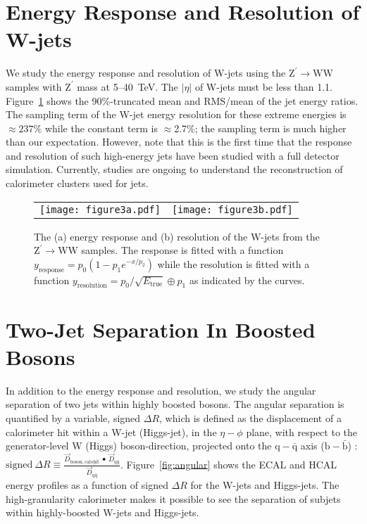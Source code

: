 \documentclass{PoS}
\begin{document}
\section{Energy Response and Resolution of W-jets \label{sec:jetresponse}}
We study the energy response and resolution of W-jets using the 
$\mathrm{Z}^{\prime}\rightarrow \mathrm{WW}$ samples with $\mathrm{Z}^{\prime}$ 
mass at 5--40~TeV. The $\left|\eta\right|$ of W-jets must be less than 1.1. 
Figure~\ref{fig:wjet} shows the 90\%-truncated mean and RMS/mean of the jet 
energy ratios. 
The sampling term of the W-jet energy resolution for these extreme energies 
is $\approx 237\%$ while the constant term is $\approx$2.7\%;
the sampling term is much higher than our expectation. 
However, note that this is the first time that the response and resolution of 
such high-energy jets have been studied with a full detector simulation. 
Currently, studies are ongoing to understand the reconstruction
of calorimeter clusters used for jets. 

\begin{figure}
\begin{center}
\begin{tabular}{cc}
\texttt{[image: figure3a.pdf]} &
\texttt{[image: figure3b.pdf]} \\
\end{tabular}
\end{center}
\caption{The (a) energy response and (b) resolution of the W-jets from the 
$\mathrm{Z}^{\prime}\rightarrow \mathrm{WW}$ samples. The response is fitted 
with a function $y_\mathrm{response} = p_0\left(1-p_1 e^{-x/p_2}\right)$ 
while the resolution is fitted with a function 
$y_\mathrm{resolution}=p_0/\sqrt{E_\mathrm{true}}\oplus p_1$ as indicated 
by the curves.
}
\label{fig:wjet}
\end{figure}

\section{Two-Jet Separation In Boosted Bosons \label{sec:angular}}
In addition to the energy response and resolution, we study the angular 
separation of two jets within highly boosted bosons. The angular separation 
is quantified by a variable, signed $\Delta R$, which is defined as the 
displacement of a calorimeter hit within a W-jet (Higgs-jet), in the 
$\eta-\phi$ plane, with respect to the generator-level W (Higgs) boson-direction, projected onto the $\mathrm{q}-\bar{\mathrm{q}}$ 
axis ($\mathrm{b}-\bar{\mathrm{b}}$) : \( \mathrm{signed}~\Delta R \equiv 
\frac{\overrightarrow{D}_{\mathrm{boson,calohit}}~\bullet~\overrightarrow{D}_{\mathrm{q}\bar{\mathrm{q}}}}{\overrightarrow{D}_{\mathrm{q}\bar{\mathrm{q}}}}\). 
Figure~\ref{fig:angular} shows the ECAL and HCAL energy profiles as a function 
of signed $\Delta R$ for the W-jets and Higgs-jets. The high-granularity 
calorimeter makes it possible to see the separation of subjets within 
highly-boosted W-jets and Higgs-jets.
\end{document}
